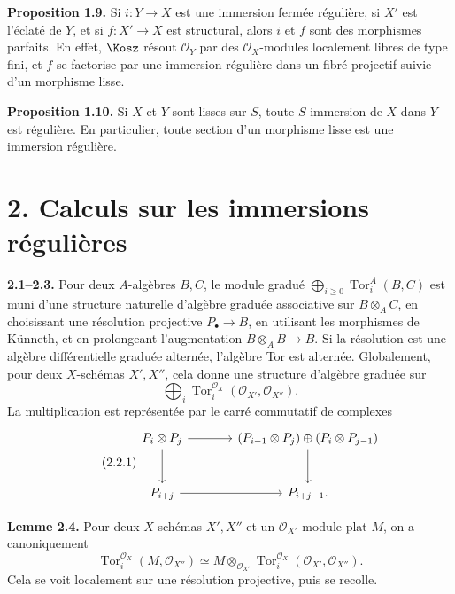 \documentclass[11pt]{article}
\newcommand{\Tor}{\operatorname{Tor}}
\providecommand{\Tor}{\operatorname{Tor}}
\providecommand{\cO}{\mathcal O}
\begin{document}
\textbf{Proposition 1.9.} Si \(i:Y\to X\) est une immersion fermée régulière, si \(X'\) est l'éclaté de \(Y\), et si \(f:X'\to X\) est structural, alors \(i\) et \(f\) sont des morphismes parfaits. En effet, \(\Kosz\) résout \(\cO_Y\) par des \(\cO_X\)-modules localement libres de type fini, et \(f\) se factorise par une immersion régulière dans un fibré projectif suivie d'un morphisme lisse.

\textbf{Proposition 1.10.} Si \(X\) et \(Y\) sont lisses sur \(S\), toute \(S\)-immersion de \(X\) dans \(Y\) est régulière. En particulier, toute section d'un morphisme lisse est une immersion régulière.

\section*{2. Calculs sur les immersions régulières}

\textbf{2.1--2.3.} Pour deux \(A\)-algèbres \(B,C\), le module gradué \(\bigoplus_{i\ge0}\Tor_i^A(B,C)\) est muni d'une structure naturelle d'algèbre graduée associative sur \(B\otimes_A C\), en choisissant une résolution projective \(P_\bullet\to B\), en utilisant les morphismes de Künneth, et en prolongeant l'augmentation \(B\otimes_A B\to B\). Si la résolution est une algèbre différentielle graduée alternée, l'algèbre Tor est alternée. Globalement, pour deux \(X\)-schémas \(X',X''\), cela donne une structure d'algèbre graduée sur
\[
\bigoplus_i\Tor_i^{\cO_X}(\cO_{X'},\cO_{X''}).
\]
La multiplication est représentée par le carré commutatif de complexes
\begin{equation}\tag{2.2.1}
\begin{tikzcd}[column sep=large,row sep=large]
P_i\otimes P_j \arrow[r] \arrow[d] & (P_{i-1}\otimes P_j)\oplus(P_i\otimes P_{j-1}) \arrow[d]\\
P_{i+j} \arrow[r] & P_{i+j-1}.
\end{tikzcd}
\end{equation}

\textbf{Lemme 2.4.} Pour deux \(X\)-schémas \(X',X''\) et un \(\cO_{X'}\)-module plat \(M\), on a canoniquement
\begin{equation}\tag{2.4.1}
\Tor_i^{\cO_X}(M,\cO_{X''})\simeq
M\otimes_{\cO_{X'}}\Tor_i^{\cO_X}(\cO_{X'},\cO_{X''}).
\end{equation}
Cela se voit localement sur une résolution projective, puis se recolle.
\end{document}
